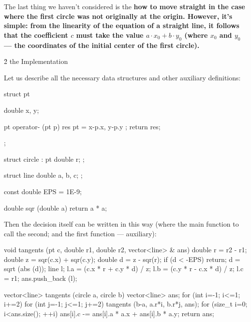 The last thing we haven't considered is the \bf{how to move straight} in the case where the first circle was not originally at the origin. However, it's simple: from the linearity of the equation of a straight line, it follows that the coefficient $c$ must take the value $a \cdot x_0 + b \cdot y_0$ (where $x_0$ and $y_0$ --- the coordinates of the initial center of the first circle).


\h2{ the Implementation }

Let us describe all the necessary data structures and other auxiliary definitions:

\code
struct pt {
double x, y;

pt operator- (pt p) {
res pt = { x-p.x, y-p.y };
return res;
}
};

struct circle : pt {
double r;
};

struct line {
double a, b, c;
};

const double EPS = 1E-9;

double sqr (double a) {
return a * a;
}
\endcode

Then the decision itself can be written in this way (where the main function to call the second; and the first function --- auxiliary):

\code
void tangents (pt c, double r1, double r2, vector<line> & ans) {
double r = r2 - r1;
double z = sqr(c.x) + sqr(c.y);
double d = z - sqr(r);
if (d < -EPS) return;
d = sqrt (abs (d));
line l;
l.a = (c.x * r + c.y * d) / z;
l.b = (c.y * r - c.x * d) / z;
l.c = r1;
ans.push_back (l);
}

vector<line> tangents (circle a, circle b) {
vector<line> ans;
for (int i=-1; i<=1; i+=2)
for (int j=-1; j<=1; j+=2)
tangents (b-a, a.r*i, b.r*j, ans);
for (size_t i=0; i<ans.size(); ++i)
ans[i].c -= ans[i].a * a.x + ans[i].b * a.y;
return ans;
}
\endcode




